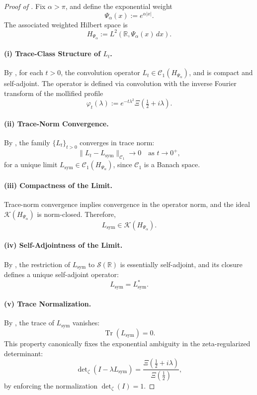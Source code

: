 \begin{proof}[Proof of ]
Fix \( \alpha > \pi \), and define the exponential weight
\[
\Psi_\alpha(x) := e^{\alpha |x|}.
\]
The associated weighted Hilbert space is
\[
H_{\Psi_\alpha} := L^2(\mathbb{R}, \Psi_\alpha(x)\, dx).
\]

\paragraph{(i) Trace-Class Structure of \( L_t \).}
By , for each \( t > 0 \), the convolution operator \( L_t \in \mathcal{C}_1(H_{\Psi_\alpha}) \), and is compact and self-adjoint. The operator is defined via convolution with the inverse Fourier transform of the mollified profile
\[
\varphi_t(\lambda) := e^{-t\lambda^2} \Xi\left( \tfrac{1}{2} + i\lambda \right).
\]

\paragraph{(ii) Trace-Norm Convergence.}
By , the family \( \{L_t\}_{t > 0} \) converges in trace norm:
\[
\| L_t - L_{\mathrm{sym}} \|_{\mathcal{C}_1} \to 0 \quad \text{as } t \to 0^+,
\]
for a unique limit \( L_{\mathrm{sym}} \in \mathcal{C}_1(H_{\Psi_\alpha}) \), since \( \mathcal{C}_1 \) is a Banach space.

\paragraph{(iii) Compactness of the Limit.}
Trace-norm convergence implies convergence in the operator norm, and the ideal \( \mathcal{K}(H_{\Psi_\alpha}) \) is norm-closed. Therefore,
\[
L_{\mathrm{sym}} \in \mathcal{K}(H_{\Psi_\alpha}).
\]

\paragraph{(iv) Self-Adjointness of the Limit.}
By , the restriction of \( L_{\mathrm{sym}} \) to \( \mathcal{S}(\mathbb{R}) \) is essentially self-adjoint, and its closure defines a unique self-adjoint operator:
\[
L_{\mathrm{sym}} = L_{\mathrm{sym}}^*.
\]

\paragraph{(v) Trace Normalization.}
By , the trace of \( L_{\mathrm{sym}} \) vanishes:
\[
\operatorname{Tr}(L_{\mathrm{sym}}) = 0.
\]
This property canonically fixes the exponential ambiguity in the zeta-regularized determinant:
\[
\det\nolimits_{\zeta}(I - \lambda L_{\mathrm{sym}}) = \frac{\Xi\left( \tfrac{1}{2} + i\lambda \right)}{\Xi\left( \tfrac{1}{2} \right)},
\]
by enforcing the normalization \( \det\nolimits_{\zeta}(I) = 1 \).


\end{proof}
